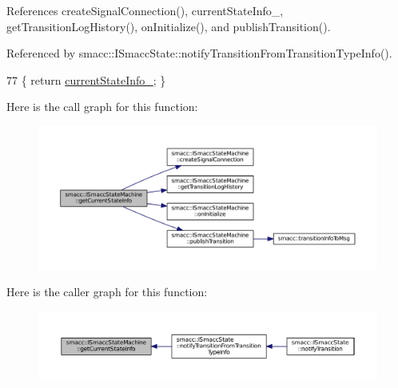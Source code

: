 References create\+Signal\+Connection(), current\+State\+Info\+\_\+, get\+Transition\+Log\+History(), on\+Initialize(), and publish\+Transition().



Referenced by smacc\+::\+I\+Smacc\+State\+::notify\+Transition\+From\+Transition\+Type\+Info().


\begin{DoxyCode}
77 \{ \textcolor{keywordflow}{return} \hyperlink{classsmacc_1_1ISmaccStateMachine_ac8ac420db18ed72cc0c7535f16c0aae8}{currentStateInfo\_}; \}
\end{DoxyCode}


Here is the call graph for this function\+:
\nopagebreak
\begin{figure}[H]
\begin{center}
\leavevmode
\includegraphics[width=350pt]{classsmacc_1_1ISmaccStateMachine_a1c455c0f33506e59a7f4389e3fe99ffe_cgraph}
\end{center}
\end{figure}




Here is the caller graph for this function\+:
\nopagebreak
\begin{figure}[H]
\begin{center}
\leavevmode
\includegraphics[width=350pt]{classsmacc_1_1ISmaccStateMachine_a1c455c0f33506e59a7f4389e3fe99ffe_icgraph}
\end{center}
\end{figure}


